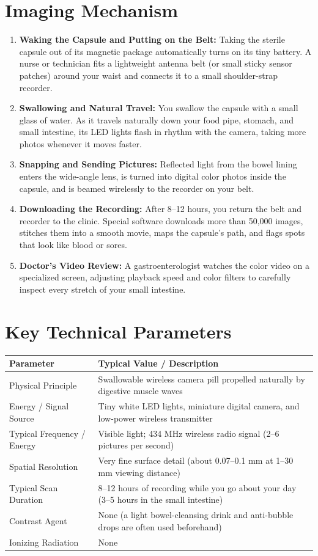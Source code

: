\section{Imaging Mechanism}
\begin{enumerate}
    \item \textbf{Waking the Capsule and Putting on the Belt:} Taking the sterile capsule out of its magnetic package automatically turns on its tiny battery. A nurse or technician fits a lightweight antenna belt (or small sticky sensor patches) around your waist and connects it to a small shoulder-strap recorder.
    \item \textbf{Swallowing and Natural Travel:} You swallow the capsule with a small glass of water. As it travels naturally down your food pipe, stomach, and small intestine, its LED lights flash in rhythm with the camera, taking more photos whenever it moves faster.
    \item \textbf{Snapping and Sending Pictures:} Reflected light from the bowel lining enters the wide-angle lens, is turned into digital color photos inside the capsule, and is beamed wirelessly to the recorder on your belt.
    \item \textbf{Downloading the Recording:} After 8--12 hours, you return the belt and recorder to the clinic. Special software downloads more than 50,000 images, stitches them into a smooth movie, maps the capsule's path, and flags spots that look like blood or sores.
    \item \textbf{Doctor's Video Review:} A gastroenterologist watches the color video on a specialized screen, adjusting playback speed and color filters to carefully inspect every stretch of your small intestine.
\end{enumerate}

\section{Key Technical Parameters}
\noindent
\begin{tabularx}{\textwidth}{@{}l X@{}}
\toprule
\textbf{Parameter} & \textbf{Typical Value / Description} \\
\midrule
Physical Principle & Swallowable wireless camera pill propelled naturally by digestive muscle waves \\
Energy / Signal Source & Tiny white LED lights, miniature digital camera, and low-power wireless transmitter \\
Typical Frequency / Energy & Visible light; 434 MHz wireless radio signal (2--6 pictures per second) \\
Spatial Resolution & Very fine surface detail (about 0.07--0.1 mm at 1--30 mm viewing distance) \\
Typical Scan Duration & 8--12 hours of recording while you go about your day (3--5 hours in the small intestine) \\
Contrast Agent & None (a light bowel-cleansing drink and anti-bubble drops are often used beforehand) \\
Ionizing Radiation & None \\
\bottomrule
\end{tabularx}

